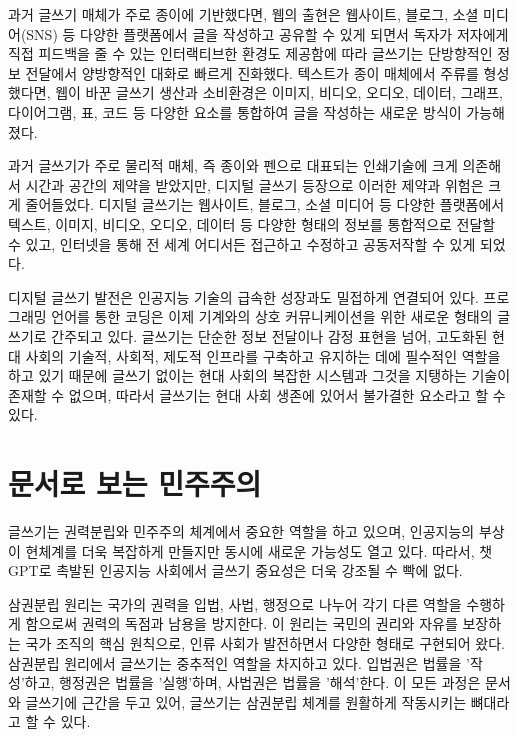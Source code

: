 \documentclass[
  letterpaper,
]{book}
\begin{document}
과거 글쓰기 매체가 주로 종이에 기반했다면, 웹의 출현은 웹사이트, 블로그,
소셜 미디어(SNS) 등 다양한 플랫폼에서 글을 작성하고 공유할 수 있게
되면서 독자가 저자에게 직접 피드백을 줄 수 있는 인터랙티브한 환경도
제공함에 따라 글쓰기는 단방향적인 정보 전달에서 양방향적인 대화로 빠르게
진화했다. 텍스트가 종이 매체에서 주류를 형성했다면, 웹이 바꾼 글쓰기
생산과 소비환경은 이미지, 비디오, 오디오, 데이터, 그래프, 다이어그램,
표, 코드 등 다양한 요소를 통합하여 글을 작성하는 새로운 방식이
가능해졌다.

과거 글쓰기가 주로 물리적 매체, 즉 종이와 펜으로 대표되는 인쇄기술에
크게 의존해서 시간과 공간의 제약을 받았지만, 디지털 글쓰기 등장으로
이러한 제약과 위험은 크게 줄어들었다. 디지털 글쓰기는 웹사이트, 블로그,
소셜 미디어 등 다양한 플랫폼에서 텍스트, 이미지, 비디오, 오디오, 데이터
등 다양한 형태의 정보를 통합적으로 전달할 수 있고, 인터넷을 통해 전 세계
어디서든 접근하고 수정하고 공동저작할 수 있게 되었다.

디지털 글쓰기 발전은 인공지능 기술의 급속한 성장과도 밀접하게 연결되어
있다. 프로그래밍 언어를 통한 코딩은 이제 기계와의 상호 커뮤니케이션을
위한 새로운 형태의 글쓰기로 간주되고 있다. 글쓰기는 단순한 정보 전달이나
감정 표현을 넘어, 고도화된 현대 사회의 기술적, 사회적, 제도적 인프라를
구축하고 유지하는 데에 필수적인 역할을 하고 있기 때문에 글쓰기 없이는
현대 사회의 복잡한 시스템과 그것을 지탱하는 기술이 존재할 수 없으며,
따라서 글쓰기는 현대 사회 생존에 있어서 불가결한 요소라고 할 수 있다.

\hypertarget{uxbb38uxc11cuxb85c-uxbcf4uxb294-uxbbfcuxc8fcuxc8fcuxc758}{%
\section{문서로 보는
민주주의}\label{uxbb38uxc11cuxb85c-uxbcf4uxb294-uxbbfcuxc8fcuxc8fcuxc758}}

글쓰기는 권력분립와 민주주의 체계에서 중요한 역할을 하고 있으며,
인공지능의 부상이 현체계를 더욱 복잡하게 만들지만 동시에 새로운 가능성도
열고 있다. 따라서, 챗GPT로 촉발된 인공지능 사회에서 글쓰기 중요성은 더욱
강조될 수 빡에 없다.

삼권분립 원리는 국가의 권력을 입법, 사법, 행정으로 나누어 각기 다른
역할을 수행하게 함으로써 권력의 독점과 남용을 방지한다. 이 원리는 국민의
권리와 자유를 보장하는 국가 조직의 핵심 원칙으로, 인류 사회가 발전하면서
다양한 형태로 구현되어 왔다. 삼권분립 원리에서 글쓰기는 중추적인 역할을
차지하고 있다. 입법권은 법률을 '작성'하고, 행정권은 법률을 '실행'하며,
사법권은 법률을 '해석'한다. 이 모든 과정은 문서와 글쓰기에 근간을 두고
있어, 글쓰기는 삼권분립 체계를 원활하게 작동시키는 뼈대라고 할 수 있다.
\end{document}
